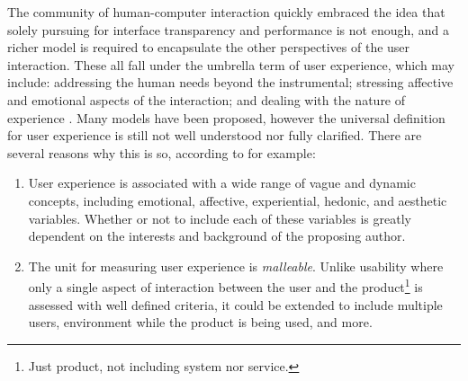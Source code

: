 \documentclass{acm_proc_article-sp}
\begin{document}
The community of human-computer interaction quickly embraced the idea
that solely pursuing for interface transparency and performance is not
enough, and a richer model is required to encapsulate the other
perspectives of the user interaction. These all fall under the
umbrella term of user experience, which may include: addressing the
human needs beyond the instrumental; stressing affective and emotional
aspects of the interaction; and dealing with the nature of experience
\citep{ux:hassenzahl}. Many models have been proposed, however the
universal definition for user experience is still not well understood
nor fully clarified. There are several reasons why this is so,
according to \citet{ux:law} for example:
\begin{enumerate}
  \item User experience is associated with a wide range of vague and
    dynamic concepts, including emotional, affective, experiential,
    hedonic, and aesthetic variables. Whether or not to include each
    of these variables is greatly dependent on the interests and
    background of the proposing author.
  \item The unit for measuring user experience is
    \textit{malleable}. Unlike usability where only a single aspect of
    interaction between the user and the product\footnote{Just
      product, not including system nor service.} is assessed with
    well defined criteria, it could be extended to include multiple
    users, environment while the product is being used, and more.
\end{enumerate}
\end{document}
